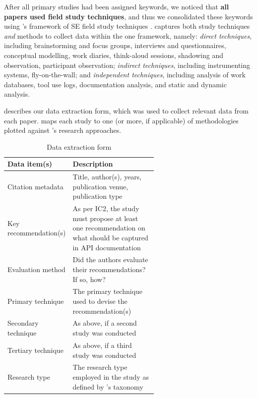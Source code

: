 After all primary studies had been assigned keywords, we noticed that \textbf{all papers used field study techniques}, and thus we consolidated these keywords using \citeauthor{Singer:2007tu}'s framework of SE field study techniques \citep{Singer:2007tu}. \citeauthor{Singer:2007tu} captures both study techniques \textit{and} methods to collect data within the one framework, namely: \textit{direct techniques}, including brainstorming and focus groups, interviews and questionnaires, conceptual modelling, work diaries, think-aloud sessions, shadowing and observation, participant observation; \textit{indirect techniques}, including instrumenting systems, fly-on-the-wall; and \textit{independent techniques}, including analysis of work databases, tool use logs, documentation analysis, and static and dynamic analysis. 

 describes our data extraction form, which was used to collect relevant data from each paper.  maps each study to one (or more, if applicable) of methodologies plotted against \citeauthor{Wieringa:2006vd}'s research approaches.

\begin{table}[tb]
  \caption[Data extraction in API documentation knowledge study]{Data extraction form}
  \label{esem2019:tab:extraction}
  \centering
  \begin{tabular}{l|p{0.6\linewidth}}
    \toprule
    \textbf{Data item(s)} &
    \textbf{Description}
    \\
    \midrule
    Citation metadata & Title, author(s), years, publication venue, publication type \\
    Key recommendation(s) & As per IC2, the study must propose at least one recommendation on what should be captured in API documentation \\
    Evaluation method & Did the authors evaluate their recommendations? If so, how? \\
    Primary technique & The primary technique used to devise the recommendation(s) \\ 
    Secondary technique & As above, if a second study was conducted \\
    Tertiary technique & As above, if a third study was conducted \\
    Research type & The research type employed in the study as defined by \citeauthor{Wieringa:2006vd}'s taxonomy \\
    \bottomrule
  \end{tabular}
\end{table}

